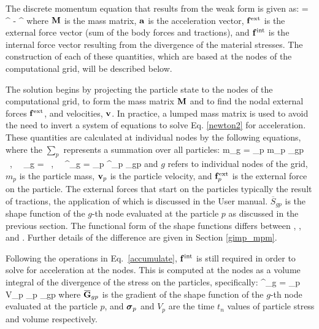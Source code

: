 The discrete momentum equation that results from the weak form is given as:
\Beq \label{newton2}
  \BMv \Ba = \Bf^{\Text} - \Bf^{\Tint} 
\Eeq
where $\mathbf{M}$ is the mass matrix, $\mathbf{a}$ is the acceleration vector,
$\mathbf{f}^{\text{ext}}$ is the external force vector (sum of the body forces and
tractions), and $\mathbf{f}^{\text{int}}$ is the internal force vector resulting from
the divergence of the material stresses.  The construction of each of these
quantities, which are based at the nodes of the computational grid,
will be described below.

The solution begins by projecting the particle state to the
nodes of the computational grid, to form the mass matrix $\mathbf{M}$ and to find
the nodal external forces $\mathbf{f}^{\text{ext}}$, and velocities,
$\mathbf{v}$.  In practice, a lumped mass matrix is used to avoid the need to
invert a system of equations to solve Eq. \eqref{newton2} for acceleration.
These quantities are calculated at individual nodes by the following equations,
where the $\sum\limits_{p}$ represents a summation over all particles:
\Beq \label{accumulate}
  m_g = \sum_p m_p _{gp} ~,~~
  \Bv_g = ~,~~
  \Bf^{\Text}_g = \sum_p \Bf^{\Text}_p _{gp}
\Eeq
and $g$ refers to individual nodes of the grid, $m_p$ is the particle
mass, $\mathbf{v}_p$ is the particle velocity, and $\mathbf{f}^{\text{ext}}_p$ is the
external force on the particle.  The external forces that start on the
particles typically the result of tractions, the application of which is
discussed in the \Vaango User manual.
$\overbar{S}_{gp}$ is the shape function of the $g$-th node evaluated at
the particle $p$ as discussed in the previous section.
The functional form of the shape functions differs between \MPM, \GIMP, and \CPDI.
Further details of the difference are given in Section \ref{gimp_mpm}.

Following the operations in Eq.~\ref{accumulate}, $\mathbf{f}^{\text{int}}$
is still required in order to solve for acceleration at the nodes.
This is computed at the nodes as a volume integral of the divergence
of the stress on the particles, specifically:
\Beq \label{computeIntForce}  
  \Bf^{\Tint}_g = \sum_p V_p \Bsig_p \overbar{\BGv}_{gp}
\Eeq
where $\overbar{\BGv}_{gp}$ is the gradient of the shape function of the $g$-th node
evaluated at the particle $p$, and $\boldsymbol{\sigma}_p$ and $V_p$ are the time $t_n$ values of
particle stress and volume respectively.  

